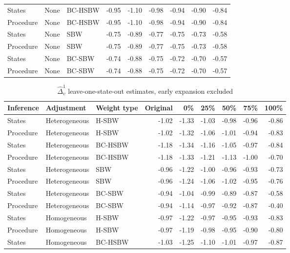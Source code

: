 \begin{table}[ht]
\begin{tabular}{lllrrrrrr}
  States & None & BC-HSBW & -0.95 & -1.10 & -0.98 & -0.94 & -0.90 & -0.84 \\ 
  Procedure & None & BC-HSBW & -0.95 & -1.10 & -0.98 & -0.94 & -0.90 & -0.84 \\ 
  States & None & SBW & -0.75 & -0.89 & -0.77 & -0.75 & -0.73 & -0.58 \\ 
  Procedure & None & SBW & -0.75 & -0.89 & -0.77 & -0.75 & -0.73 & -0.58 \\ 
  States & None & BC-SBW & -0.74 & -0.88 & -0.75 & -0.72 & -0.70 & -0.57 \\ 
  Procedure & None & BC-SBW & -0.74 & -0.88 & -0.75 & -0.72 & -0.70 & -0.57 \\ 
   \hline
\end{tabular}
\end{table}

\begin{table}[ht]
\label{tab:rdiffc2}
\caption{$\hat{\Delta}^1_v$ leave-one-state-out estimates, early expansion excluded}
\centering
\begin{tabular}{lllrrrrrr}
  \hline
Inference & Adjustment & Weight type & Original & 0\% & 25\% & 50\% & 75\% & 100\% \\ 
  \hline
States & Heterogeneous & H-SBW & -1.02 & -1.33 & -1.03 & -0.98 & -0.96 & -0.86 \\ 
  Procedure & Heterogeneous & H-SBW & -1.02 & -1.32 & -1.06 & -1.01 & -0.94 & -0.83 \\ 
  States & Heterogeneous & BC-HSBW & -1.18 & -1.34 & -1.16 & -1.05 & -0.97 & -0.84 \\ 
  Procedure & Heterogeneous & BC-HSBW & -1.18 & -1.33 & -1.21 & -1.13 & -1.00 & -0.70 \\ 
  States & Heterogeneous & SBW & -0.96 & -1.22 & -1.00 & -0.96 & -0.93 & -0.73 \\ 
  Procedure & Heterogeneous & SBW & -0.96 & -1.24 & -1.06 & -1.02 & -0.95 & -0.76 \\ 
  States & Heterogeneous & BC-SBW & -0.94 & -1.04 & -0.99 & -0.89 & -0.87 & -0.58 \\ 
  Procedure & Heterogeneous & BC-SBW & -0.94 & -1.14 & -0.97 & -0.92 & -0.87 & -0.40 \\ 
  States & Homogeneous & H-SBW & -0.97 & -1.22 & -0.97 & -0.95 & -0.93 & -0.83 \\ 
  Procedure & Homogeneous & H-SBW & -0.97 & -1.19 & -0.98 & -0.95 & -0.90 & -0.80 \\ 
  States & Homogeneous & BC-HSBW & -1.03 & -1.25 & -1.10 & -1.01 & -0.97 & -0.87 \\ 

\end{tabular}
\end{table}
